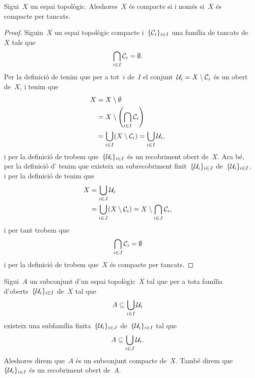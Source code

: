 \documentclass[../../main.tex]{subfiles}
\begin{document}
	\begin{proposition}
		\label{prop:compacte si i només si compacte per tancats}
		\label{prop:equivalència entre compacitat i compacitat per tancats}
		Sigui~\(X\) un espai topològic.
		Aleshores~\(X\) és compacte si i només si~\(X\) és compacte per tancats.
		\begin{proof}
			Siguin~\(X\) un espai topològic compacte i~\(\{\mathcal{C}_{i}\}_{i\in I}\) una família de tancats de~\(X\) tals que
			\[
			    \bigcap_{i\in I}\mathcal{C}_{i}=\emptyset.
			\]
			Per la definició de  tenim que per a tot~\(i\) de~\(I\) el conjunt~\(\mathcal{U}_{i}=X\setminus\mathcal{C}_{i}\) és un obert de~\(X\), i tenim que
			\begin{align*}
				X&=X\setminus\emptyset \\
				&=X\setminus\left(\bigcap_{i\in I}\tancat{C}_{i}\right) \\
				&=\bigcup_{i\in I}(X\setminus\tancat{C}_{i})=\bigcup_{i\in I}\obert{U}_{i},
			\end{align*}
			i per la definició de  trobem que~\(\{\mathcal{U}_{i}\}_{i\in I}\) és un recobriment obert de~\(X\).
			Ara bé, per la definició d' tenim que existeix un subrecobriment finit~\(\{\mathcal{U}_{i}\}_{i\in J}\) de~\(\{\mathcal{U}_{i}\}_{i\in I}\), i per la definició de  tenim que
			\begin{align*}
				X&=\bigcup_{i\in J}\mathcal{U}_{i} \\
				&=\bigcup_{i\in J}(X\setminus\mathcal{C}_{i})=X\setminus\bigcap_{i\in J}\mathcal{C}_{i},
			\end{align*} %
			i per tant trobem que
			\[
			    \bigcap_{i\in J}\mathcal{C}_{i}=\emptyset
			\]
			i per la definició de  trobem que~\(X\) és compacte per tancats.
		\end{proof}
	\end{proposition}
	\begin{definition}
		\label{def:compacitat d'un subconjunt}
		\label{def:subconjunt compacte}
		\label{def:recobriment obert d'un subconjunt}
		Sigui~\(A\) un subconjunt d'un espai topològic~\(X\) tal que per a tota família d'oberts~\(\{\mathcal{U}_{i}\}_{i\in I}\) de~\(X\) tal que
		\[
		    A\subseteq\bigcup_{i\in I}\mathcal{U}_{i}
		\]
		existeix una subfamília finita~\(\{\mathcal{U}_{i}\}_{i\in J}\) de~\(\{\mathcal{U}_{i}\}_{i\in I}\) tal que
		\[
		    A\subseteq\bigcup_{i\in J}\mathcal{U}_{i}.
		\]
		Aleshores direm que~\(A\) és un subconjunt compacte de~\(X\).
		També direm que~\(\{\mathcal{U}_{i}\}_{i\in I}\) és un recobriment obert de~\(A\).
	\end{definition}
\end{document}

